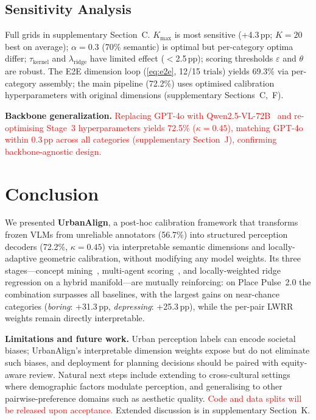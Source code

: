 \documentclass[runningheads]{llncs}
\begin{document}
\subsection{Sensitivity Analysis}
\label{sec:sensitivity}

Full grids in supplementary Section~C.
$K_{\max}$ is most sensitive (+4.3\,pp; $K{=}20$ best on average); $\alpha{=}0.3$ (70\% semantic) is optimal but per-category optima differ; $\tau_{\mathrm{kernel}}$ and $\lambda_{\mathrm{ridge}}$ have limited effect ($<$2.5\,pp); scoring thresholds $\varepsilon$ and $\theta$ are robust.
The E2E dimension loop (\cref{eq:e2e}, 12/15 trials) yields 69.3\% via per-category assembly; the main pipeline (72.2\%) uses optimised calibration hyperparameters with original dimensions (supplementary Sections~C,~F).

\smallskip\noindent\textbf{Backbone generalization.}
\textcolor{red}{Replacing GPT-4o with Qwen2.5-VL-72B~\cite{bai2025qwen25vl} and re-optimising Stage~3 hyperparameters yields 72.5\% ($\kappa{=}0.45$), matching GPT-4o within 0.3\,pp across all categories (supplementary Section~J), confirming backbone-agnostic design.}

\section{Conclusion}
\label{sec:conclusion}

We presented \textbf{UrbanAlign}, a post-hoc calibration framework that transforms frozen VLMs from unreliable annotators (56.7\%) into structured perception decoders (72.2\%, $\kappa{=}0.45$) via interpretable semantic dimensions and locally-adaptive geometric calibration, without modifying any model weights.
Its three stages---concept mining~\cite{koh2020concept}, multi-agent scoring~\cite{du2024improving}, and locally-weighted ridge regression on a hybrid manifold---are mutually reinforcing: on Place Pulse~2.0 the combination surpasses all baselines, with the largest gains on near-chance categories (\emph{boring}: +31.3\,pp, \emph{depressing}: +25.3\,pp), while the per-pair LWRR weights remain directly interpretable.

\smallskip\noindent\textbf{Limitations and future work.}
Urban perception labels can encode societal biases; UrbanAlign's interpretable dimension weights expose but do not eliminate such biases, and deployment for planning decisions should be paired with equity-aware review.
Natural next steps include extending to cross-cultural settings~\cite{pp2chinese2025,quintana2025specs} where demographic factors modulate perception, and generalising to other pairwise-preference domains such as aesthetic quality.
\textcolor{red}{Code and data splits will be released upon acceptance.}
Extended discussion is in supplementary Section~K.



\end{document}

